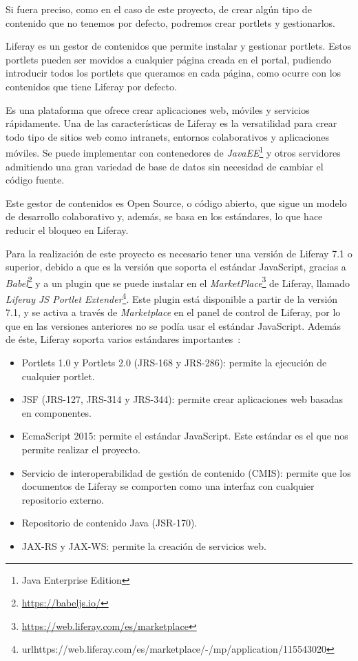 \documentclass[a4paper, 12pt]{book}
\begin{document}
Si fuera preciso, como en el caso de este proyecto, de crear algún tipo de contenido que no tenemos por defecto, podremos crear portlets y gestionarlos.

\vspace{5mm}
Liferay es un gestor de contenidos que permite instalar y gestionar portlets. Estos portlets pueden ser movidos a cualquier página creada en el portal, pudiendo introducir todos los portlets que queramos en cada página, como ocurre con los contenidos que tiene Liferay por defecto.

Es una plataforma que ofrece crear aplicaciones web, móviles y servicios rápidamente. Una de las características de Liferay es la versatilidad para crear todo tipo de sitios web como intranets, entornos colaborativos y aplicaciones móviles. Se puede implementar con contenedores de \textit{JavaEE}\footnote{Java Enterprise Edition} y otros servidores admitiendo una gran variedad de base de datos sin necesidad de cambiar el código fuente.

Este gestor de contenidos es Open Source, o código abierto, que sigue un modelo de desarrollo colaborativo y, además, se basa en los estándares, lo que hace reducir el bloqueo en Liferay. 

\vspace{5mm}
Para la realización de este proyecto es necesario tener una versión de Liferay 7.1 o superior, debido a que es la versión que soporta el estándar JavaScript, gracias a \textit{Babel}\footnote{\url{https://babeljs.io/}} y a un plugin que se puede instalar en el \textit{MarketPlace}\footnote{\url{https://web.liferay.com/es/marketplace}} de Liferay, llamado \textit{Liferay JS Portlet Extender}\footnote{url{https://web.liferay.com/es/marketplace/-/mp/application/115543020}}. Este plugin está disponible a partir de la versión 7.1, y se activa a través de \textit{Marketplace} en el panel de control de Liferay, por lo que en las versiones anteriores no se podía usar el estándar JavaScript. Además de éste, Liferay soporta varios estándares importantes~\cite{liferay_dxp}:

\begin{itemize}
\item Portlets 1.0 y Portlets 2.0 (JRS-168 y JRS-286): permite la ejecución de cualquier portlet.
\item JSF (JRS-127, JRS-314 y JRS-344): permite crear aplicaciones web basadas en componentes.
\item EcmaScript 2015: permite el estándar JavaScript. Este estándar es el que nos permite realizar el proyecto.
\item Servicio de interoperabilidad de gestión de contenido (CMIS): permite que los documentos de Liferay se comporten como una interfaz con cualquier repositorio externo.
\item Repositorio de contenido Java (JSR-170).
\item JAX-RS y JAX-WS: permite la creación de servicios web.
\end{itemize}
\end{document}
